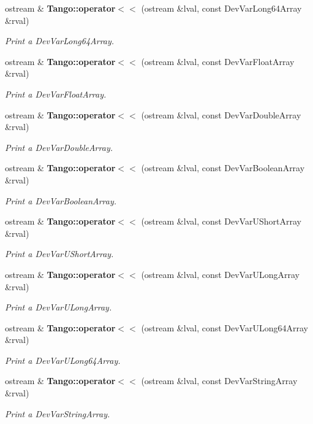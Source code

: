 \begin{DoxyCompactItemize}
ostream \& {\bf Tango\-::operator$<$$<$} (ostream \&lval, const Dev\-Var\-Long64\-Array \&rval)
\begin{DoxyCompactList}\small\item\em Print a Dev\-Var\-Long64\-Array. \end{DoxyCompactList}\item 
ostream \& {\bf Tango\-::operator$<$$<$} (ostream \&lval, const Dev\-Var\-Float\-Array \&rval)
\begin{DoxyCompactList}\small\item\em Print a Dev\-Var\-Float\-Array. \end{DoxyCompactList}\item 
ostream \& {\bf Tango\-::operator$<$$<$} (ostream \&lval, const Dev\-Var\-Double\-Array \&rval)
\begin{DoxyCompactList}\small\item\em Print a Dev\-Var\-Double\-Array. \end{DoxyCompactList}\item 
ostream \& {\bf Tango\-::operator$<$$<$} (ostream \&lval, const Dev\-Var\-Boolean\-Array \&rval)
\begin{DoxyCompactList}\small\item\em Print a Dev\-Var\-Boolean\-Array. \end{DoxyCompactList}\item 
ostream \& {\bf Tango\-::operator$<$$<$} (ostream \&lval, const Dev\-Var\-U\-Short\-Array \&rval)
\begin{DoxyCompactList}\small\item\em Print a Dev\-Var\-U\-Short\-Array. \end{DoxyCompactList}\item 
ostream \& {\bf Tango\-::operator$<$$<$} (ostream \&lval, const Dev\-Var\-U\-Long\-Array \&rval)
\begin{DoxyCompactList}\small\item\em Print a Dev\-Var\-U\-Long\-Array. \end{DoxyCompactList}\item 
ostream \& {\bf Tango\-::operator$<$$<$} (ostream \&lval, const Dev\-Var\-U\-Long64\-Array \&rval)
\begin{DoxyCompactList}\small\item\em Print a Dev\-Var\-U\-Long64\-Array. \end{DoxyCompactList}\item 
ostream \& {\bf Tango\-::operator$<$$<$} (ostream \&lval, const Dev\-Var\-String\-Array \&rval)
\begin{DoxyCompactList}\small\item\em Print a Dev\-Var\-String\-Array. \end{DoxyCompactList}\item 

\end{DoxyCompactItemize}
